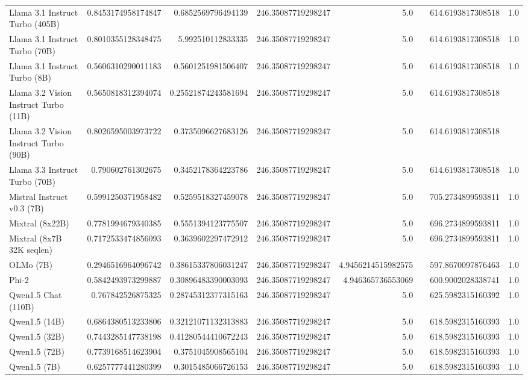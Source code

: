 \begin{table}[htp]
{\begin{tabular}{lrrrrrrr}
Llama 3.1 Instruct Turbo (405B) & 0.8453174958174847 & 0.6852569796494139 & 246.35087719298247 & 5.0 &  & 614.6193817308518 & 1.0 \\
Llama 3.1 Instruct Turbo (70B) & 0.8010355128348475 & 5.992510112833335 & 246.35087719298247 & 5.0 &  & 614.6193817308518 & 1.0 \\
Llama 3.1 Instruct Turbo (8B) & 0.5606310290011183 & 0.5601251981506407 & 246.35087719298247 & 5.0 &  & 614.6193817308518 & 1.0 \\
Llama 3.2 Vision Instruct Turbo (11B) & 0.5650818312394074 & 0.25521874243581694 & 246.35087719298247 & 5.0 &  & 614.6193817308518 &  \\
Llama 3.2 Vision Instruct Turbo (90B) & 0.8026595003973722 & 0.3735096627683126 & 246.35087719298247 & 5.0 &  & 614.6193817308518 &  \\
Llama 3.3 Instruct Turbo (70B) & 0.790602761302675 & 0.3452178364223786 & 246.35087719298247 & 5.0 &  & 614.6193817308518 & 1.0 \\
Mistral Instruct v0.3 (7B) & 0.5991250371958482 & 0.5259518327459078 & 246.35087719298247 & 5.0 &  & 705.2734899593811 & 1.0 \\
Mixtral (8x22B) & 0.7781994679340385 & 0.5551394123775507 & 246.35087719298247 & 5.0 &  & 696.2734899593811 & 1.0 \\
Mixtral (8x7B 32K seqlen) & 0.7172533474856093 & 0.3639602297472912 & 246.35087719298247 & 5.0 &  & 696.2734899593811 & 1.0 \\
OLMo (7B) & 0.2946516964096742 & 0.38615337806031247 & 246.35087719298247 & 4.9456214515982575 &  & 597.8670097876463 & 1.0 \\
Phi-2 & 0.5842493973299887 & 0.30896483390003093 & 246.35087719298247 & 4.946365736553069 &  & 600.9002028338741 & 1.0 \\
Qwen1.5 Chat (110B) & 0.767842526875325 & 0.28745312377315163 & 246.35087719298247 & 5.0 &  & 625.5982315160392 & 1.0 \\
Qwen1.5 (14B) & 0.6864380513233806 & 0.32121071132313883 & 246.35087719298247 & 5.0 &  & 618.5982315160393 & 1.0 \\
Qwen1.5 (32B) & 0.7443285147738198 & 0.41280544410672243 & 246.35087719298247 & 5.0 &  & 618.5982315160393 & 1.0 \\
Qwen1.5 (72B) & 0.7739168514623904 & 0.3751045908565104 & 246.35087719298247 & 5.0 &  & 618.5982315160393 & 1.0 \\
Qwen1.5 (7B) & 0.6257777441280399 & 0.3015485066726153 & 246.35087719298247 & 5.0 &  & 618.5982315160393 & 1.0 \\

\end{tabular}}
\end{table}
